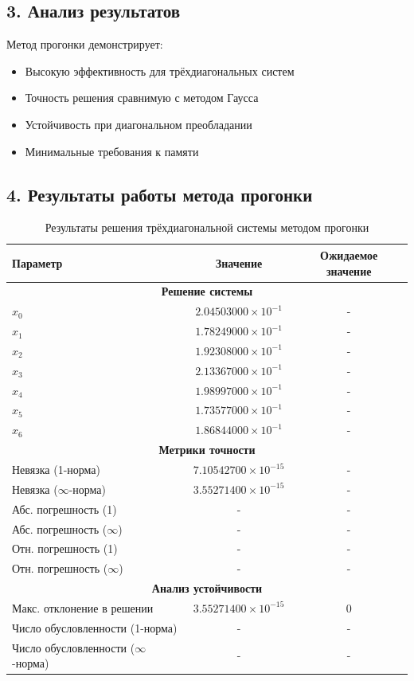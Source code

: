 \documentclass[12pt, a4paper]{article}
\begin{document}
\subsection*{3. Анализ результатов}

Метод прогонки демонстрирует:
\begin{itemize}
\item Высокую эффективность для трёхдиагональных систем
\item Точность решения сравнимую с методом Гаусса
\item Устойчивость при диагональном преобладании
\item Минимальные требования к памяти
\end{itemize}
\subsection*{4. Результаты работы метода прогонки}

\begin{table}[h]
\centering
\caption{Результаты решения трёхдиагональной системы методом прогонки}
\begin{tabular}{|l|c|c|}
\hline
\textbf{Параметр} & \textbf{Значение} & \textbf{Ожидаемое значение} \\
\hline
\multicolumn{3}{|c|}{\textbf{Решение системы}} \\
\hline
$x_0$ & $2.04503000 \times 10^{-1}$ & - \\
$x_1$ & $1.78249000 \times 10^{-1}$ & - \\
$x_2$ & $1.92308000 \times 10^{-1}$ & - \\
$x_3$ & $2.13367000 \times 10^{-1}$ & - \\
$x_4$ & $1.98997000 \times 10^{-1}$ & - \\
$x_5$ & $1.73577000 \times 10^{-1}$ & - \\
$x_6$ & $1.86844000 \times 10^{-1}$ & - \\
\hline
\multicolumn{3}{|c|}{\textbf{Метрики точности}} \\
\hline
Невязка (1-норма) & $7.10542700 \times 10^{-15}$ & - \\
Невязка ($\infty$-норма) & $3.55271400 \times 10^{-15}$ & - \\
Абс. погрешность (1) & - & - \\
Абс. погрешность ($\infty$) & - & - \\
Отн. погрешность (1) & - & - \\
Отн. погрешность ($\infty$) & - & - \\
\hline
\multicolumn{3}{|c|}{\textbf{Анализ устойчивости}} \\
\hline
Макс. отклонение в решении & $3.55271400 \times 10^{-15}$ & 0 \\
Число обусловленности (1-норма) & - & - \\
Число обусловленности ($\infty$-норма) & - & - \\
\hline
\end{tabular}
\end{table}
\end{document}

